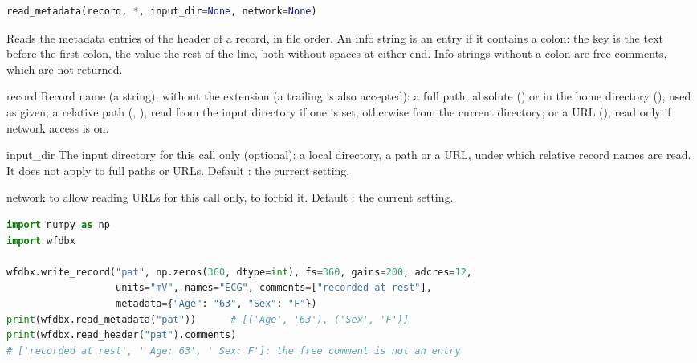 \begin{lstlisting}[language=Python,style=signature]
read_metadata(record, *, input_dir=None, network=None)
\end{lstlisting}
Reads the metadata entries of the header of a record, in file order. An info string is an
entry if it contains a colon: the key is the text before the first colon, the value the
rest of the line, both without spaces at either end. Info strings without a colon are free
comments, which are not returned.
\begin{params}
\item[record] Record name (a string), without the  extension (a trailing
   is also accepted): a full path, absolute () or in
  the home directory (), used as given; a relative
  path (, ), read from the input directory if one is set,
  otherwise from the current directory; or a URL
  (), read only if network access is
  on.
\item[input\_dir] The input directory for this call only (optional): a local directory, a
  \code{\textasciitilde} path or a URL, under which relative record names are read. It
  does not apply to full paths or URLs. Default : the current setting.
\item[network]  to allow reading URLs for this call only,  to
  forbid it. Default : the current setting.
\end{params}
\begin{lstlisting}[language=Python,style=example]
import numpy as np
import wfdbx

wfdbx.write_record("pat", np.zeros(360, dtype=int), fs=360, gains=200, adcres=12,
                   units="mV", names="ECG", comments=["recorded at rest"],
                   metadata={"Age": "63", "Sex": "F"})
print(wfdbx.read_metadata("pat"))      # [('Age', '63'), ('Sex', 'F')]
print(wfdbx.read_header("pat").comments)
# ['recorded at rest', ' Age: 63', ' Sex: F']: the free comment is not an entry
\end{lstlisting}

